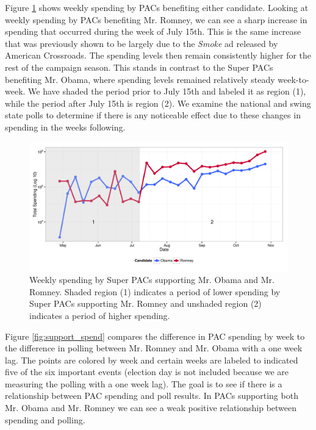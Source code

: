 \documentclass[11pt]{article}\usepackage{graphicx, color}
\newenvironment{knitrout}{}{} %
\begin{document}
Figure \ref{fig:trend_plot} shows weekly spending by PACs benefiting either candidate. Looking at weekly spending by PACs benefiting Mr. Romney, we can see a sharp increase in spending that occurred during the week of July 15th. This is the same increase that was previously shown to be largely due to the \textit{Smoke} ad released by American Crossroads. The spending levels then remain consistently higher for the rest of the campaign season. This stands in contrast to the Super PACs benefiting Mr. Obama, where spending levels remained relatively steady week-to-week. We have shaded the period prior to July 15th and labeled it as region (1), while the period after July 15th is region (2). We examine the national and swing state polls to determine if there is any noticeable effect due to these changes in spending in the weeks following.

\begin{knitrout}
\color{fgcolor}\begin{figure}[H]


{\centering \includegraphics[width=\textwidth]{figure/trend_plot} 

}

\caption[Weekly spending by Super PACs supporting Mr]{Weekly spending by Super PACs supporting Mr. Obama and Mr. Romney. Shaded region (1) indicates a period of lower spending by Super PACs supporting Mr. Romney and unshaded region (2) indicates a period of higher spending.\label{fig:trend_plot}}
\end{figure}


\end{knitrout}


Figure \ref{fig:support_spend} compares the difference in PAC spending by week to the difference in polling between Mr. Romney and Mr. Obama with a one week lag. The points are colored by week and certain weeks are labeled to indicated five of the six important events (election day is not included because we are measuring the polling with a one week lag). The goal is to see if there is a relationship between PAC spending and poll results. In PACs supporting both Mr. Obama and Mr. Romney we can see a weak positive relationship between spending and polling.
\end{document}
